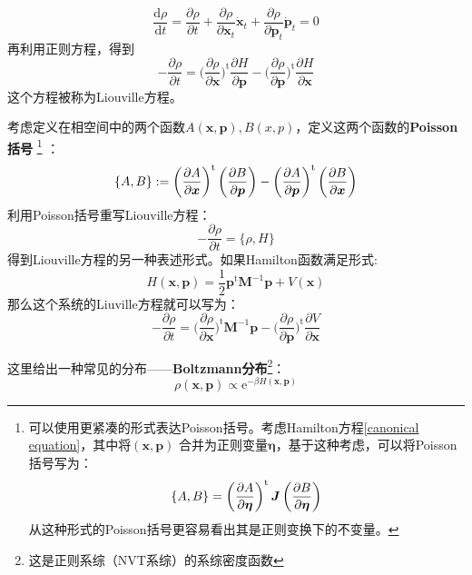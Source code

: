     \begin{equation}
        \frac{\mathrm{d}\rho}{\mathrm{d}t} = \frac {\partial \rho}{\partial t} + \frac {\partial \rho}{\partial \bm{x}_t}\dot{\bm{x}}_t  + \frac {\partial \rho}{\partial \bm{p}_t} \dot{\bm{p}}_t = 0
    \end{equation}
    再利用正则方程，得到
    \begin{equation}
        - \frac {\partial \rho}{\partial t} = \bigg(\frac {\partial \rho}{\partial \bm{x}}\bigg)^\mathrm{t} \frac {\partial H}{\partial \bm{p}} - 
        \bigg(\frac {\partial \rho}{\partial \bm{p}}\bigg)^\mathrm{t} \frac {\partial H}{\partial \bm{x}}
        \label{Liouville equation Euler}
    \end{equation}
    这个方程被称为Liouville方程。
    \par 
    考虑定义在相空间中的两个函数$A(\bm{x}, \bm{p}),B(x ,p)$，定义这两个函数的\textbf{Poisson括号}
    \footnote{
        可以使用更紧凑的形式表达Poisson括号。考虑Hamilton方程\ref{canonical equation}，其中将$(\bm{x}, \bm{p})$
        合并为正则变量$\bm{\eta}$，基于这种考虑，可以将Poisson括号写为：
        \begin{equation}
            \{A, B\} = \left(\frac{\partial{A}}{\partial{\bm{\eta}}}\right)^{\mathrm{t}}\bm{J}\left(\frac{\partial{B}}{\partial{\bm{\eta}}}\right)
        \end{equation}
        从这种形式的Poisson括号更容易看出其是正则变换下的不变量。
    }
    ：
    \begin{equation}
        \{A, B\} := \left(\frac{\partial{A}}{\partial{\bm{x}}}\right)^{\mathrm{t}}\left(\frac{\partial{B}}{\partial{\bm{p}}}\right) - \left(\frac{\partial{A}}{\partial{\bm{p}}}\right)^{\mathrm{t}}\left(\frac{\partial{B}}{\partial{\bm{x}}}\right)
    \end{equation}
    利用Poisson括号重写Liouville方程：
    \begin{equation}
        - \frac {\partial \rho}{\partial t} = \{ \rho, H\}
    \end{equation}
    得到Liouville方程的另一种表述形式。如果Hamilton函数满足形式:
    \begin{equation}
        H(\bm{x},\bm{p}) = \frac{1}{2}\bm{p}^\mathrm{t} \bm{M}^{-1} \bm{p} + V(\bm{x})
    \end{equation}
    那么这个系统的Liuville方程就可以写为：
    \begin{equation} 
        - \frac {\partial \rho}{\partial t} = \bigg(\frac {\partial \rho}{\partial \bm{x}}\bigg)^\mathrm{t} \bm{M}^{-1} \bm{p}
         - \bigg(\frac {\partial \rho}{\partial \bm{p}}\bigg)^\mathrm{t} \frac {\partial V}{\partial \bm{x}}
    \end{equation}
    \par
    这里给出一种常见的分布——\textbf{Boltzmann分布}\footnote{这是正则系综（NVT系综）的系综密度函数}：
    \begin{equation}
        \rho(\bm{x},\bm{p}) \propto \mathrm{e}^{-\beta H(\bm{x},\bm{p})}
    \end{equation}

